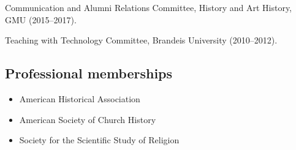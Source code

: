 \documentclass[11pt]{article}
\providecommand{\tightlist}{%
  \setlength{\itemsep}{0pt}\setlength{\parskip}{0pt}}
\begin{document}
Communication and Alumni Relations Committee, History and Art History, GMU 
(2015--2017).

Teaching with Technology Committee, Brandeis University (2010--2012).





\subsection{Professional memberships}\label{Memberships}

\begin{itemize}
    \tightlist
    \item American Historical Association
    \item American Society of Church History
    \item Society for the Scientific Study of Religion
\end{itemize}
\end{document}
